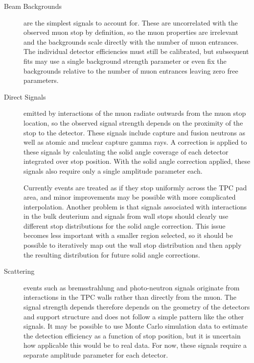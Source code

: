 \begin{description}
\item[Beam Backgrounds] are the simplest signals to account for.  
These are uncorrelated with the observed muon stop by definition, so the muon properties are irrelevant and the backgrounds scale directly with the number of muon entrances.
The individual detector efficiencies must still be calibrated, but subsequent fits may use a single background strength parameter or even fix the backgrounds relative to the number of muon entrances leaving zero free parameters.

\item[Direct Signals] emitted by interactions of the muon radiate outwards from the muon stop location, so the observed signal strength depends on the proximity of the stop to the detector.
These signals include capture and fusion neutrons as well as atomic and nuclear capture gamma rays.
A correction is applied to these signals by calculating the solid angle coverage of each detector integrated over stop position.
With the solid angle correction applied, these signals also require only a single amplitude parameter each.

Currently events are treated as if they stop uniformly across the TPC pad area, and minor improvements may be possible with more complicated interpolation.
Another problem is that signals associated with interactions in the bulk deuterium and signals from wall stops should clearly use different stop distributions for the solid angle correction.  
This issue becomes less important with a smaller region selected, so it should be possible to iteratively map out the wall stop distribution and then apply the resulting distribution for future solid angle corrections.

\item[Scattering] events such as bremsstrahlung and photo-neutron signals originate from interactions in the TPC walls rather than directly from the muon.
The signal strength depends therefore depends on the geometry of the detectors and support structure and does not follow a simple pattern like the other signals.
It may be possible to use Monte Carlo simulation data to estimate the detection efficiency as a function of stop position, but it is uncertain how applicable this would be to real data.  
For now, these signals require a separate amplitude parameter for each detector.
\end{description}

